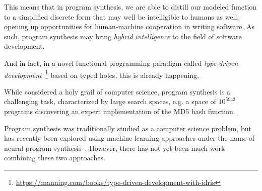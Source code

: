 \documentclass{article}
\begin{document}
This means that in program synthesis, we are able to distill our modeled function
to a simplified discrete form that may well be intelligible to humans as well,
opening up opportunities for human-machine cooperation in writing software.
As such, program synthesis may bring \emph{hybrid intelligence} to the field of software development.

And in fact, in a novel functional programming paradigm called
\emph{type-driven development}~\footnote{\url{https://manning.com/books/type-driven-development-with-idris}}
based on typed holes, this is already happening.

While considered a holy grail of computer science, program synthesis is a challenging task, characterized by large search spaces,
e.g. a space of $10^{5943}$ programs discovering an expert implementation of the MD5 hash function.~\cite{gulwani2017program}

Program synthesis was traditionally studied as a computer science problem,
but has recently been explored using machine learning approaches under the name of neural program synthesis~\citep{nps}.
However, there has not yet been much work combining these two approaches.

\end{document}
